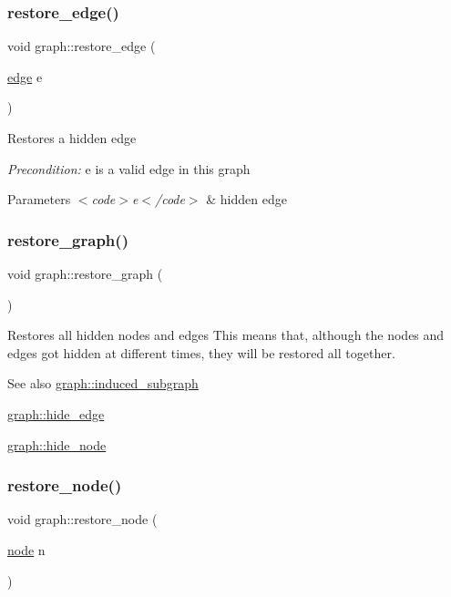 \subsubsection{\texorpdfstring{restore\+\_\+edge()}{restore\_edge()}}
{\footnotesize\ttfamily void graph\+::restore\+\_\+edge (\begin{DoxyParamCaption}\item[{\mbox{\hyperlink{classedge}{edge}}}]{e }\end{DoxyParamCaption})}

Restores a hidden edge

{\itshape Precondition\+:} {\ttfamily e} is a valid edge in this graph


\begin{DoxyParams}{Parameters}
{\em $<$code$>$e$<$/code$>$} & hidden edge \\
\hline
\end{DoxyParams}
\mbox{\label{classgraph_a53e2a5505fa6427587e12d66e4a86cec}} 
\subsubsection{\texorpdfstring{restore\+\_\+graph()}{restore\_graph()}}
{\footnotesize\ttfamily void graph\+::restore\+\_\+graph (\begin{DoxyParamCaption}{ }\end{DoxyParamCaption})}

Restores all hidden nodes and edges This means that, although the nodes and edges got hidden at different times, they will be restored all together.

\begin{DoxySeeAlso}{See also}
\mbox{\hyperlink{classgraph_ad185dbb16a66777632eb13eec3c54244}{graph\+::induced\+\_\+subgraph}} 

\mbox{\hyperlink{classgraph_ab2f8520bcac080d73c55228fecc61825}{graph\+::hide\+\_\+edge}} 

\mbox{\hyperlink{classgraph_a4f0177ffe8eaddd9c5bec73078bed873}{graph\+::hide\+\_\+node}} 
\end{DoxySeeAlso}
\mbox{\label{classgraph_ab57aab79e649cc275052b7decbdd03ec}} 
\subsubsection{\texorpdfstring{restore\+\_\+node()}{restore\_node()}}
{\footnotesize\ttfamily void graph\+::restore\+\_\+node (\begin{DoxyParamCaption}\item[{\mbox{\hyperlink{classnode}{node}}}]{n }\end{DoxyParamCaption})}

